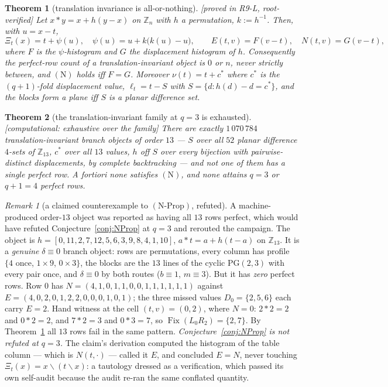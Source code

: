 \documentclass[11pt]{article}
\theoremstyle{plain}
\newtheorem{theorem}{Theorem}[section]
\theoremstyle{definition}
\theoremstyle{remark}
\newtheorem*{remark*}{Remark}
\numberwithin{equation}{section}
\newcommand{\Z}{\mathbb{Z}}
\newcommand{\op}{\mathbin{*}}
\newcommand{\Fix}{\operatorname{Fix}}
\newcommand{\statusbox}[1]{{\small\sloppy\textsf{[#1]}}}
\newcommand{\MV}[1]{\statusbox{machine-verified: \texttt{#1}}}
\newcommand{\PROVED}[1]{\statusbox{proved in #1, root-verified}}
\newcommand{\COMP}[1]{\statusbox{computational: #1}}
\begin{document}
\begin{theorem}[translation invariance is all-or-nothing]\label{thm:transallnothing}
\PROVED{R9-L}
Let $x\op y = x+h(y-x)$ on $\Z_n$ with $h$ a permutation, $k := h^{-1}$. Then, with
$u = x-t$,
\[
  \Xi_t(x) = t+\psi(u),\quad \psi(u) = u+k\bigl(k(u)-u\bigr),\qquad
  E(t,v) = F(v-t),\quad N(t,v) = G(v-t),
\]
where $F$ is the $\psi$-histogram and $G$ the displacement histogram of $h$.
Consequently the perfect-row count of a translation-invariant object is $0$ or
$n$, never strictly between, and $(\mathrm{N})$ holds iff $F = G$. Moreover
$\nu(t) = t+c^{*}$ where $c^{*}$ is the $(q+1)$-fold displacement value,
$\ell_t = t-S$ with $S = \{d : h(d)-d = c^{*}\}$, and the blocks form a plane iff
$S$ is a planar difference set.
\end{theorem}

\begin{theorem}[the translation-invariant family at $q = 3$ is
exhausted]\label{thm:transq3}
\COMP{exhaustive over the family}\;\MV{problems\slash etp677\slash R9L\_translation.c}
There are exactly $1\,070\,784$ translation-invariant branch objects of order
$13$ --- $S$ over all $52$ planar difference $4$-sets of $\Z_{13}$, $c^{*}$ over
all $13$ values, $h$ off $S$ over every bijection with pairwise-distinct
displacements, by complete backtracking --- and \emph{not one of them has a single
perfect row}. A fortiori none satisfies $(\mathrm{N})$, and none attains $q = 3$
or $q+1 = 4$ perfect rows.
\end{theorem}

\begin{remark*}[a claimed counterexample to
$(\mathrm{N}\text{-}\mathrm{Prop})$, refuted]
A machine-produced order-$13$ object was reported as having all $13$ rows perfect,
which would have refuted Conjecture~\ref{conj:NProp} at $q = 3$ and rerouted the
campaign. The object is $h = [0,11,2,7,12,5,6,3,9,8,4,1,10]$,
$a\op t = a+h(t-a)$ on $\Z_{13}$. It is a \emph{genuine} $\delta\equiv0$ branch
object: rows are permutations, every column has profile $\{4$ once, $1\times9$,
$0\times3\}$, the blocks are the $13$ lines of the cyclic $\mathrm{PG}(2,3)$ with
every pair once, and $\delta\equiv0$ by both routes ($b\equiv1$, $m\equiv3$). But
it has \emph{zero} perfect rows. Row $0$ has
$N = (4,1,0,1,1,0,0,1,1,1,1,1,1)$ against
$E = (4,0,2,0,1,2,2,0,0,0,1,0,1)$; the three missed values $D_0 = \{2,5,6\}$ each
carry $E = 2$. Hand witness at the cell $(t,v) = (0,2)$, where $N = 0$:
$2\op2 = 2$ and $0\op2 = 2$, and $7\op2 = 3$ and $0\op3 = 7$, so
$\Fix(L_0R_2) = \{2,7\}$. By Theorem~\ref{thm:transallnothing} all $13$ rows fail
in the same pattern. \emph{Conjecture~\ref{conj:NProp} is not refuted at $q = 3$.}
The claim's derivation computed the histogram of the table column --- which is
$N(t,\cdot)$ --- called it $E$, and concluded $E = N$, never touching
$\Xi_t(x) = x\backslash(t\backslash x)$: a tautology dressed as a verification,
which passed its own self-audit because the audit re-ran the same conflated
quantity.
\end{remark*}
\end{document}
